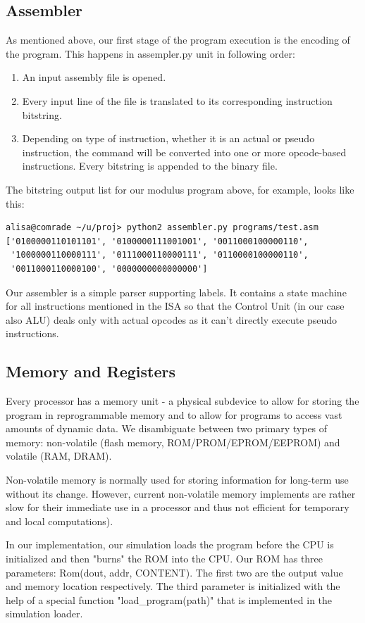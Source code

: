 \documentclass[12pt,a4paper]{scrartcl}
\begin{document}
\newpage
\subsection{Assembler}
As mentioned above, our first stage of the program execution is the encoding of the program. This happens in assempler.py unit in following order:
\begin{enumerate}
	\item An input assembly file is opened.
	\item Every input line of the file is translated to its corresponding instruction bitstring.
	\item Depending on type of instruction, whether it is an actual or pseudo instruction, the command will be converted into one or more opcode-based instructions. Every bitstring is appended to the binary file.
\end{enumerate}
The bitstring output list for our modulus program above, for example, looks like this:
\begin{verbatim}
alisa@comrade ~/u/proj> python2 assembler.py programs/test.asm
['0100000110101101', '0100000111001001', '0011000100000110',
 '1000000110000111', '0111000110000111', '0110000100000110',
 '0011000110000100', '0000000000000000']
\end{verbatim} 
Our assembler is a simple parser supporting labels. It contains a state machine for all instructions mentioned in the ISA so that the Control Unit (in our case also ALU) deals only with actual opcodes as it can't directly execute pseudo instructions.\\

\subsection{Memory and Registers}
Every processor has a memory unit - a physical subdevice to allow for storing the program in reprogrammable memory and to allow for programs to access vast amounts of dynamic data. We disambiguate between two primary types of memory: non-volatile (flash memory,  ROM/PROM/EPROM/EEPROM) and volatile (RAM, DRAM).

Non-volatile memory is normally used for storing information for long-term use without its change. However, current non-volatile memory implements are rather slow for their immediate use in a processor and thus not efficient for temporary and local computations).

In our implementation, our simulation loads the program before the CPU is initialized and then "burns" the ROM into the CPU. Our ROM has three parameters: Rom(dout, addr, CONTENT). The first two are the output value and memory location respectively. The third parameter is initialized with the help of a special function "load\_program(path)" that is implemented in the simulation loader.
\end{document}
